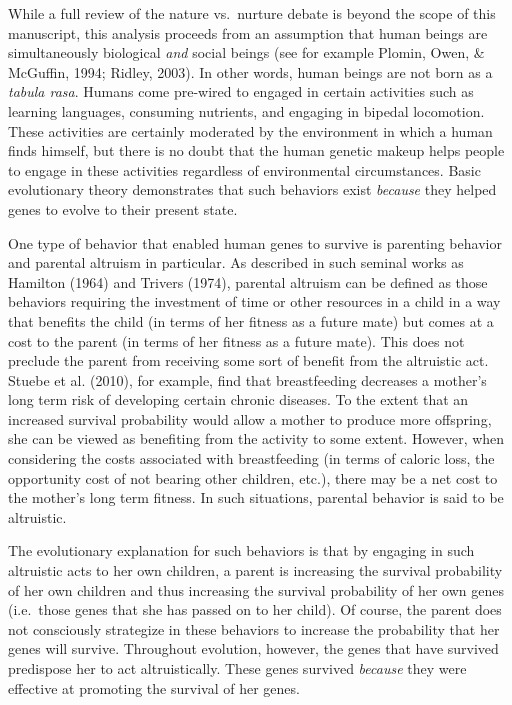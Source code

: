 \documentclass[]{elsarticle}
\begin{document}
While a full review of the nature vs.~nurture debate is beyond the scope
of this manuscript, this analysis proceeds from an assumption that human
beings are simultaneously biological \emph{and} social beings (see for
example Plomin, Owen, \& McGuffin, 1994; Ridley, 2003). In other words,
human beings are not born as a \emph{tabula rasa}. Humans come pre-wired
to engaged in certain activities such as learning languages, consuming
nutrients, and engaging in bipedal locomotion. These activities are
certainly moderated by the environment in which a human finds himself,
but there is no doubt that the human genetic makeup helps people to
engage in these activities regardless of environmental circumstances.
Basic evolutionary theory demonstrates that such behaviors exist
\emph{because} they helped genes to evolve to their present state.

One type of behavior that enabled human genes to survive is parenting
behavior and parental altruism in particular. As described in such
seminal works as Hamilton (1964) and Trivers (1974), parental altruism
can be defined as those behaviors requiring the investment of time or
other resources in a child in a way that benefits the child (in terms of
her fitness as a future mate) but comes at a cost to the parent (in
terms of her fitness as a future mate). This does not preclude the
parent from receiving some sort of benefit from the altruistic act.
Stuebe et al. (2010), for example, find that breastfeeding decreases a
mother's long term risk of developing certain chronic diseases. To the
extent that an increased survival probability would allow a mother to
produce more offspring, she can be viewed as benefiting from the
activity to some extent. However, when considering the costs associated
with breastfeeding (in terms of caloric loss, the opportunity cost of
not bearing other children, etc.), there may be a net cost to the
mother's long term fitness. In such situations, parental behavior is
said to be altruistic.

The evolutionary explanation for such behaviors is that by engaging in
such altruistic acts to her own children, a parent is increasing the
survival probability of her own children and thus increasing the
survival probability of her own genes (i.e.~those genes that she has
passed on to her child). Of course, the parent does not consciously
strategize in these behaviors to increase the probability that her genes
will survive. Throughout evolution, however, the genes that have
survived predispose her to act altruistically. These genes survived
\emph{because} they were effective at promoting the survival of her
genes.
\end{document}
